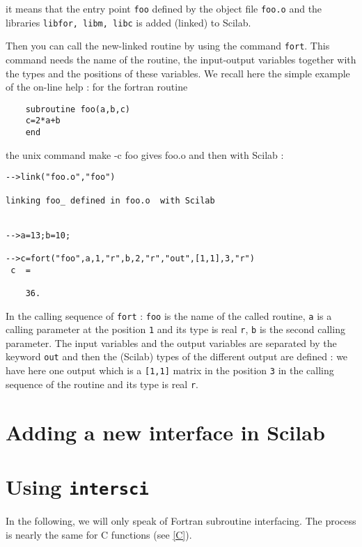 it means that the entry point {\tt foo} defined by the object file
{\tt foo.o} and the libraries {\tt libfor, libm, libc} is added (linked)
to Scilab.

Then you can call the new-linked routine by using the command {\tt fort}. This
command needs the name of the routine, the input-output variables together
with the types and the positions of these variables. We recall here the simple
example of the on-line help :
for the fortran routine 

\begin{verbatim}
	subroutine foo(a,b,c)
	c=2*a+b
	end
\end{verbatim}

the unix command make -c foo gives foo.o and then with Scilab :

\begin{verbatim}
-->link("foo.o","foo")

linking foo_ defined in foo.o  with Scilab 

 
-->a=13;b=10;
 
-->c=fort("foo",a,1,"r",b,2,"r","out",[1,1],3,"r")
 c  =
 
    36.  
\end{verbatim}

In the calling sequence of {\tt fort} : {\tt foo} is the name of the called
routine, {\tt a} is a calling parameter at the position {\tt 1} and its type is
real {\tt r}, {\tt b} is the second calling parameter. The input variables
and the output variables are separated by the keyword {\tt out} and then the
(Scilab) types of the different output are defined : we have here one 
output which is a {\tt [1,1]} matrix in the position {\tt 3} in the calling
sequence of the routine and its type is real {\tt r}.


\section{Adding a new interface in Scilab}

\section{Using {\tt intersci}}
In the following, we will only speak of Fortran subroutine interfacing. The
process is nearly the same for C functions (see \ref{C}).

\smallskip

